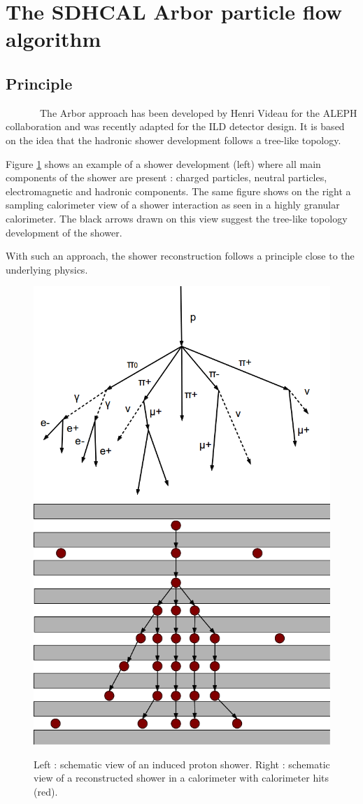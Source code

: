 \documentclass[cits]{JINST}
\begin{document}
\section{The SDHCAL Arbor particle flow algorithm}

\subsection{Principle}

~~~~~~~The Arbor approach has been developed by Henri Videau for the ALEPH collaboration and was recently adapted \cite{arbor-manqi} for the ILD detector design. It is based on the idea that the hadronic shower development follows a tree-like topology.

Figure \ref{ARBOR_STRUCTURE} shows an example of a shower development (left) where all main components of the shower are present : charged particles, neutral particles, electromagnetic and hadronic components.
The same figure shows on the right a sampling calorimeter view of a shower interaction as seen in a highly granular calorimeter. The black arrows drawn on this view suggest the tree-like topology development of the shower.

With such an approach, the shower reconstruction follows a principle close to the underlying physics.

\begin{figure}[!ht]
  \begin{center}
    \includegraphics[width=0.45\linewidth]{ProtonDecay.png} \hfill
    \includegraphics[width=0.45\linewidth]{ArborSchema.png}
  \end{center}
  \caption{\label{ARBOR_STRUCTURE} Left : schematic view of an induced proton shower. Right : schematic view of a reconstructed shower in a calorimeter with calorimeter hits (red).}
\end{figure}
\end{document}
